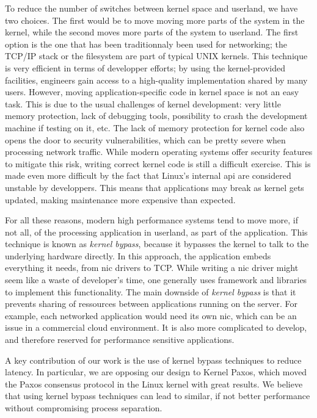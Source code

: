 To reduce the number of switches between kernel space and userland, we have two choices.
The first would be to move moving more parts of the system in the kernel, while the second moves more parts of the system to userland.
The first option is the one that has been traditionnaly been used for networking; the TCP/IP stack or the filesystem are part of typical UNIX kernels.
This technique is very efficient in terms of developper efforts; by using the kernel-provided facilities, engineers gain access to a high-quality implementation shared by many users.
However, moving application-specific code in kernel space is not an easy task.
This is due to the usual challenges of kernel development: very little memory protection, lack of debugging tools, possibility to crash the development machine if testing on it, etc.
The lack of memory protection for kernel code also opens the door to security vulnerabilities, which can be pretty severe when processing network traffic.
While modern operating systems offer security features to mitigate this risk\cite{kernel_self_protection}, writing correct kernel code is still a difficult exercise.
This is made even more difficult by the fact that Linux's internal \gls{api} are considered unstable by developpers.
This means that applications may break as kernel gets updated, making maintenance more expensive than expected.

For all these reasons, modern high performance systems tend to move more, if not all, of the processing application in userland, as part of the application.
This technique is known as \emph{kernel bypass}, because it bypasses the kernel to talk to the underlying hardware directly.
In this approach, the application embeds everything it needs, from \gls{nic} drivers to TCP.
While writing a \gls{nic} driver might seem like a waste of developer's time, one generally uses framework and libraries to implement this functionality.
The main downside of \emph{kernel bypass} is that it prevents sharing of ressources between applications running on the server.
For example, each networked application would need its own \gls{nic}, which can be an issue in a commercial cloud environment.
It is also more complicated to develop, and therefore reserved for performance sensitive applications. 

A key contribution of our work is the use of kernel bypass techniques to reduce latency.
In particular, we are opposing our design to Kernel Paxos\cite{kernelpaxos}, which moved the Paxos consensus protocol in the Linux kernel with great results.
We believe that using kernel bypass techniques can lead to similar, if not better performance without compromising process separation.
